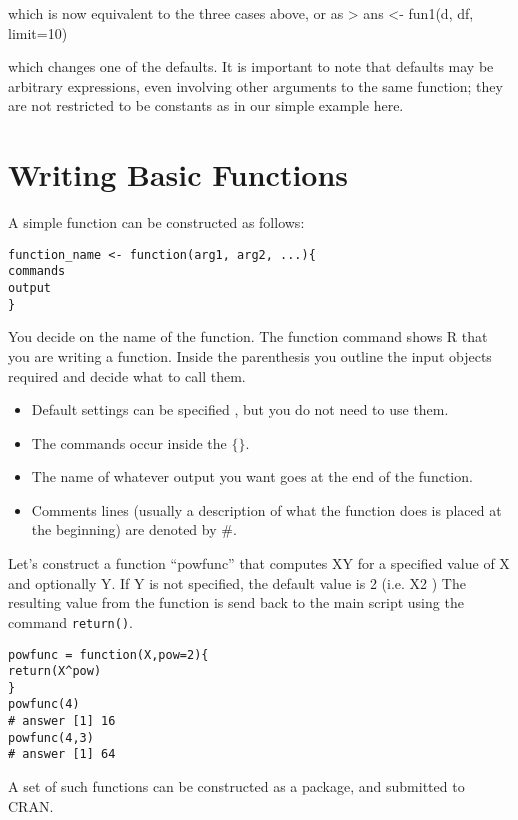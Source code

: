 which is now equivalent to the three cases above, or as 
> ans <- fun1(d, df, limit=10)


which changes one of the defaults. 
It is important to note that defaults may be arbitrary expressions, even involving other arguments to the same function; they are not restricted to be constants as in our simple example here. 
\section{Writing Basic Functions}

A simple function can be constructed as follows:

\begin{framed}
\begin{verbatim}
function_name <- function(arg1, arg2, ...){
commands
output
}
\end{verbatim}
\end{framed}
You decide on the name of the function. The function command shows R that you are writing a function. Inside the parenthesis you outline the input objects required and decide what to call them.

\begin{itemize}
\item	Default settings can be specified , but you do not need to use them.
\item	The commands occur inside the $\{ \}$.
\item	The name of whatever output you want goes at the end of the function. 
\item	Comments lines (usually a description of what the function does is placed at the beginning) are denoted by #.
\end{itemize}
Let’s construct a function “powfunc” that computes XY for a specified value of X and optionally Y. If Y is not specified, the default value is 2 (i.e. X2 )
The resulting value from the function is send back to the main script using the command \texttt{return()}.

\begin{framed}
\begin{verbatim}
powfunc = function(X,pow=2){
return(X^pow)
}
powfunc(4)
# answer [1] 16
powfunc(4,3)
# answer [1] 64
\end{verbatim}
\end{framed}

A set of such functions can be constructed as a package, and submitted to CRAN.


